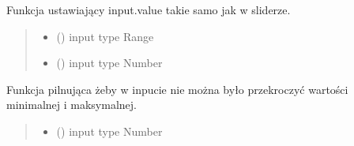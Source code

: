 \documentclass[a4paper,10pt,openany,english]{sphinxmanual}
\begin{document}

\begin{fulllineitems}
\label{\detokenize{js/js-functions:inputValue}}
\pysigstartsignatures
\pysiglinewithargsret
{}
{\sphinxparamcomma {}}
{}
\pysigstopsignatures
\sphinxAtStartPar
Funkcja ustawiający input.value takie samo jak w sliderze.
\begin{quote}\begin{description}
\begin{itemize}
\item {} 
\sphinxAtStartPar
{} () \textendash{} input type Range

\item {} 
\sphinxAtStartPar
{} () \textendash{} input type Number

\end{itemize}

\end{description}\end{quote}

\end{fulllineitems}


\begin{fulllineitems}
\label{\detokenize{js/js-functions:inputValidation}}
\pysigstartsignatures
\pysiglinewithargsret
{}
{}
{}
\pysigstopsignatures
\sphinxAtStartPar
Funkcja pilnująca żeby w inpucie nie można było przekroczyć wartości minimalnej i maksymalnej.
\begin{quote}\begin{description}
\begin{itemize}
\item {} 
\sphinxAtStartPar
{} () \textendash{} input type Number

\end{itemize}

\end{description}\end{quote}

\end{fulllineitems}
\end{document}
